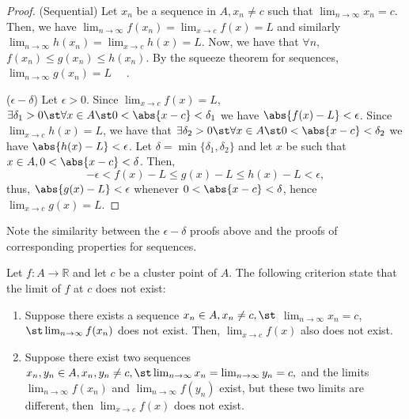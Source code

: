 \documentclass[12pt]{article}
\renewcommand{\qedsymbol}{\Libra}
\begin{document}
\begin{proof}
  (Sequential) Let $x_n$ be a sequence in $A, x_n \neq c$ such that $\lim_{n\to\infty} x_n = c$. Then, we have $\lim_{n\to\infty} f(x_n) = \lim_{x \to c} f(x) = L$ and similarly $\lim_{n\to\infty} h(x_n) = \lim_{x \to c} h(x) = L$. Now, we have that $\forall n,$ $f(x_n) \leq g(x_n) \leq h(x_n)$. By the squeeze theorem for sequences, $\lim_{n\to\infty} g(x_n) = L \quad$ \qedsymbol.

  \noindent ($\epsilon-\delta$) Let $\epsilon > 0$. Since $\lim_{x\to c} f(x) = L$, $\exists \delta_1 > 0 \st \forall x \in A \st 0 < \abs{x - c} < \delta_1$ we have $\abs{f(x) - L}< \epsilon$. Since $\lim_{x \to c} h(x) = L$, we have that $\exists \delta_2>0 \st \forall x \in A \st 0 < \abs{x - c} < \delta_2$ we have $\abs{h(x) - L} < \epsilon$. Let $\delta = \min\{\delta_1, \delta_2\}$ and let $x$ be such that $x \in A, 0 < \abs{x - c} < \delta$. Then, \[
    - \epsilon < f(x) - L \leq g(x) - L \leq h(x) - L < \epsilon,
    \]
    thus, $\abs{g(x) - L} < \epsilon$ whenever $0 < \abs{x - c} < \delta$, hence $\lim_{x \to c} g(x) = L$.
\end{proof}
\begin{remark}
  Note the similarity between the $\epsilon-\delta$ proofs above and the proofs of corresponding properties for sequences.
\end{remark}

\begin{definition}
  Let $f : A \to \mathbb{R}$ and let $c$ be a cluster point of $A$. The following criterion state that the limit of $f$ at $c$ does not exist:
  \begin{enumerate}
    \item Suppose there exists a sequence $x_n \in A, x_n \neq c, \st$ $\lim_{n \to \infty} x_n = c$, \newline$\st \lim_{n \to \infty} f(x_n)$ does not exist. Then, $\lim_{x \to c} f(x)$ also does not exist.
    \item  Suppose there exist two sequences $x_n, y_n \in A, x_n, y_n \neq c, \st \lim_{n\to\infty} x_n = \lim_{n\to\infty} y_n = c,$ and the limits $\lim_{n\to\infty} f(x_n)$ and $\lim_{n\to\infty} f(y_n)$ exist, but these two limits are different, then $\lim_{x\to c} f(x)$ does not exist.
  \end{enumerate}
\end{definition}
\end{document}
